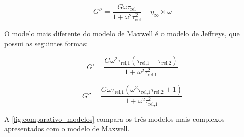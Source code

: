 			\begin{equation}
				G'' =\dfrac{  G \omega  \tau_{\textrm{rel}}        }{ 1 + \omega^2 \tau_{\textrm{rel}}^2 } + \eta_{\infty} \times \omega
				\label{eqn:modelo_oldroyd_g2}
			\end{equation}
			
			O modelo mais diferente do modelo de Maxwell é o modelo de Jeffreys, que possui as seguintes formas\cite{Lu2015}: 
			
			\begin{equation}
				G' = \dfrac{G \omega^{2} \tau_{\textrm{rel,1}} \left(\tau_{\textrm{rel,1}} - \tau_{\textrm{rel,2}}\right)}{1 + \omega^{2} \tau_{\textrm{rel,1}}^{2}}
				\label{eqn:modelo_jeffreys_g1}
			\end{equation}
			
			\begin{equation}
				G'' = \dfrac{G \omega \tau_{\textrm{rel,1}} \left(\omega^{2} \tau_{\textrm{rel,1}} \tau_{\textrm{rel,2}} + 1\right)}{1 + \omega^{2} \tau_{\textrm{rel,1}}^{2}}
				\label{eqn:modelo_jeffreys_g2}
			\end{equation}
						
			A \autoref{fig:comparativo_modelos} compara os três modelos mais complexos apresentados com o modelo de Maxwell. 
			

